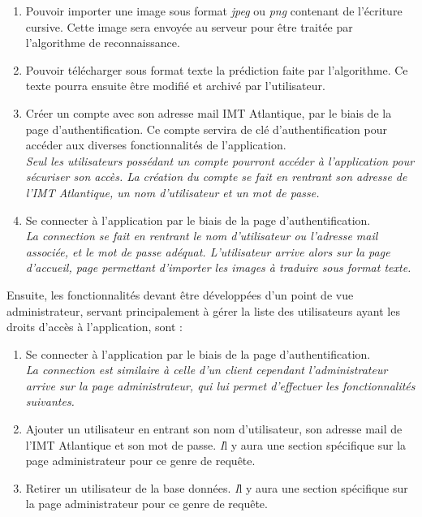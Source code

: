 \documentclass[oneside,a4paper,13pt]{article}
\begin{document}
\begin{enumerate}
    \item Pouvoir importer une image sous format \emph{jpeg} ou \emph{png} contenant de l’écriture cursive. Cette image sera envoyée au serveur pour être traitée par l'algorithme de reconnaissance. 
    
    \item Pouvoir télécharger sous format texte la prédiction faite par l'algorithme. Ce texte pourra ensuite être modifié et archivé par l'utilisateur.
    
    \item Créer un compte avec son adresse mail IMT Atlantique, par le biais de la page d’authentification. Ce compte servira de clé d'authentification pour accéder aux diverses fonctionnalités de l'application. \\
    \textit{Seul les utilisateurs possédant un compte pourront accéder à l’application pour sécuriser son accès. La création du compte se fait en rentrant son adresse de l’IMT Atlantique, un nom d’utilisateur et un mot de passe.}
    
    \item Se connecter à l’application par le biais de la page d’authentification.\\
    \textit{La connection se fait en rentrant le nom d’utilisateur ou l’adresse mail associée, et le mot de passe adéquat. L’utilisateur arrive alors sur la page d’accueil, page permettant d'importer les images à traduire sous format texte.}
\end{enumerate}

\medbreak
Ensuite, les fonctionnalités devant être développées d'un point de vue administrateur, servant principalement à gérer la liste des utilisateurs ayant les droits d'accès à l'application, sont :  

\begin{enumerate}
    \item Se connecter à l’application par le biais de la page d’authentification.\\
    \textit{La connection est similaire à celle d’un client cependant l’administrateur arrive sur la page administrateur, qui lui permet d’effectuer les fonctionnalités suivantes.}
    
    \item Ajouter un utilisateur en entrant son nom d’utilisateur, son adresse mail de l’IMT Atlantique et son mot de passe.
    \textit Il y aura une section spécifique sur la page administrateur pour ce genre de requête.
    
    \item Retirer un utilisateur de la base données.
    \textit Il y aura une section spécifique sur la page administrateur pour ce genre de requête.
\end{enumerate}
\end{document}
